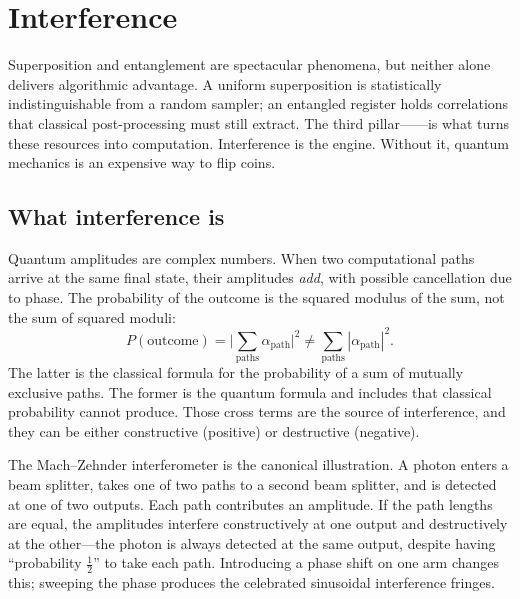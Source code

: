 \chapter{Interference}


Superposition and entanglement are spectacular phenomena, but neither alone delivers algorithmic advantage. A uniform superposition is statistically indistinguishable from a random sampler; an entangled register holds correlations that classical post-processing must still extract. The third pillar------is what turns these resources into computation. Interference is the engine. Without it, quantum mechanics is an expensive way to flip coins.

\section{What interference is}

Quantum amplitudes are complex numbers. When two computational paths arrive at the same final state, their amplitudes \emph{add}, with possible cancellation due to phase. The probability of the outcome is the squared modulus of the sum, not the sum of squared moduli:
\[
  P(\text{outcome}) = \Big|\sum_{\text{paths}} \alpha_{\text{path}}\Big|^2 \neq \sum_{\text{paths}} |\alpha_{\text{path}}|^2.
\]
The latter is the classical formula for the probability of a sum of mutually exclusive paths. The former is the quantum formula and includes  that classical probability cannot produce. Those cross terms are the source of interference, and they can be either constructive (positive) or destructive (negative).

\begin{example}
The Mach--Zehnder interferometer is the canonical illustration. A photon enters a beam splitter, takes one of two paths to a second beam splitter, and is detected at one of two outputs. Each path contributes an amplitude. If the path lengths are equal, the amplitudes interfere constructively at one output and destructively at the other---the photon is always detected at the same output, despite having ``probability $\tfrac12$'' to take each path. Introducing a phase shift on one arm changes this; sweeping the phase produces the celebrated sinusoidal interference fringes.
\end{example}

